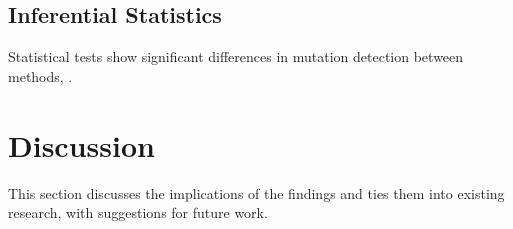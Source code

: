 \documentclass[stu,12pt,floatsintext]{apa7}
\begin{document}
\subsection{Inferential Statistics}
Statistical tests show significant differences in mutation detection between methods, .

\section{Discussion}
This section discusses the implications of the findings and ties them into existing research, with suggestions for future work.

\printbibliography
\end{document}
